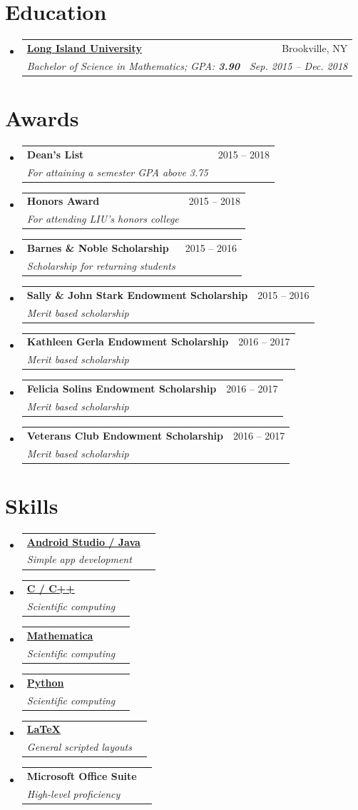 \documentclass[letterpaper,11pt]{article}
\makeatletter
\newcommand{\TwoRowSubheading}[4]{
	\item\vspace{-5pt}
		\begin{tabular*}{.97\textwidth}{l @{\extracolsep{\fill}} r}
			\textbf{#1} & #2 \\
			\textit{\small #3} & \textit{\small #4} \\
		\end{tabular*}\vspace{-5pt}
}
\makeatother
\begin{document}
\section{Education}
	\begin{itemize}[leftmargin=*]
		\TwoRowSubheading
			{\href{http://liu.edu/post}{Long Island University}}{Brookville, NY}
			{Bachelor of Science in Mathematics;  GPA: \textbf{3.90}}{Sep. 2015 -- Dec. 2018}
	\end{itemize}



\section{Awards}
	\begin{itemize}[leftmargin=*]
		\TwoRowSubheading
			{Dean's List}{2015 -- 2018}{For attaining a semester GPA above 3.75}{}
		\TwoRowSubheading
			{Honors Award}{2015 -- 2018}{For attending LIU's honors college}{}
		\TwoRowSubheading
			{Barnes \& Noble Scholarship}{2015 -- 2016}{Scholarship for returning students}{}
		\TwoRowSubheading
			{Sally \& John Stark Endowment Scholarship}{2015 -- 2016}{Merit based scholarship}{}
		\TwoRowSubheading
			{Kathleen Gerla Endowment Scholarship}{2016 -- 2017}{Merit based scholarship}{}
		\TwoRowSubheading
			{Felicia Solins Endowment Scholarship}{2016 -- 2017}{Merit based scholarship}{}
		\TwoRowSubheading
			{Veterans Club Endowment Scholarship}{2016 -- 2017}{Merit based scholarship}{}
	\end{itemize}



\section{Skills}
	\vspace*{-15pt}\begin{multicols}{3}
		\begin{itemize}[leftmargin=*]
			\TwoRowSubheading
				{\href{http://seanwevans.com/mycv}{Android Studio / Java}}{}
				{Simple app development}{}
			\TwoRowSubheading
				{\href{http://seanwevans.com/odesolver}{C / C++}}{}
				{Scientific computing}{}
			\TwoRowSubheading
				{\href{http://seanwevans.com/randommathematica}{Mathematica}}{}
				{Scientific computing}{}
			\TwoRowSubheading
				{\href{http://seanwevans.com/randompython}{Python}}{}
				{Scientific computing}{}
			\TwoRowSubheading
				{\href{http://seanwevans.com/cv}{\LaTeX}}{}
				{General scripted layouts}{}
			\TwoRowSubheading
				{Microsoft Office Suite}{}
				{High-level proficiency}{}
			\end{itemize}
	\end{multicols}
	
\end{document}
